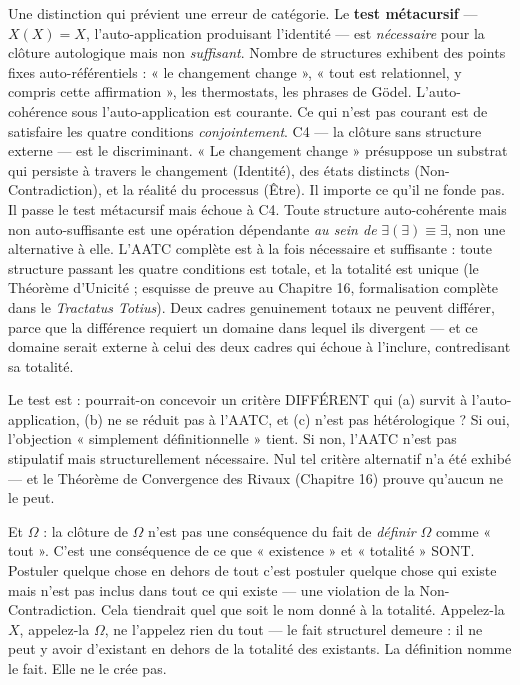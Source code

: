 \documentclass[10pt, openany, oneside]{book}
\begin{document}
Une distinction qui prévient une erreur de catégorie. Le \textbf{test métacursif} --- $X(X) = X$, l'auto-application produisant l'identité --- est \textit{nécessaire} pour la clôture autologique mais non \textit{suffisant}. Nombre de structures exhibent des points fixes auto-référentiels : « le changement change », « tout est relationnel, y compris cette affirmation », les thermostats, les phrases de Gödel. L'auto-cohérence sous l'auto-application est courante. Ce qui n'est pas courant est de satisfaire les quatre conditions \textit{conjointement}. C4 --- la clôture sans structure externe --- est le discriminant. « Le changement change » présuppose un substrat qui persiste à travers le changement (Identité), des états distincts (Non-Contradiction), et la réalité du processus (Être). Il importe ce qu'il ne fonde pas. Il passe le test métacursif mais échoue à C4. Toute structure auto-cohérente mais non auto-suffisante est une opération dépendante \textit{au sein de} $\exists(\exists) \equiv \exists$, non une alternative à elle. L'AATC complète est à la fois nécessaire et suffisante : toute structure passant les quatre conditions est totale, et la totalité est unique (le Théorème d'Unicité ; esquisse de preuve au Chapitre 16, formalisation complète dans le \textit{Tractatus Totius}). Deux cadres genuinement totaux ne peuvent différer, parce que la différence requiert un domaine dans lequel ils divergent --- et ce domaine serait externe à celui des deux cadres qui échoue à l'inclure, contredisant sa totalité.

Le test est : pourrait-on concevoir un critère DIFFÉRENT qui (a) survit à l'auto-application, (b) ne se réduit pas à l'AATC, et (c) n'est pas hétérologique ? Si oui, l'objection « simplement définitionnelle » tient. Si non, l'AATC n'est pas stipulatif mais structurellement nécessaire. Nul tel critère alternatif n'a été exhibé --- et le Théorème de Convergence des Rivaux (Chapitre 16) prouve qu'aucun ne le peut.

Et $\Omega$ : la clôture de $\Omega$ n'est pas une conséquence du fait de \textit{définir} $\Omega$ comme « tout ». C'est une conséquence de ce que « existence » et « totalité » SONT. Postuler quelque chose en dehors de tout c'est postuler quelque chose qui existe mais n'est pas inclus dans tout ce qui existe --- une violation de la Non-Contradiction. Cela tiendrait quel que soit le nom donné à la totalité. Appelez-la $X$, appelez-la $\Omega$, ne l'appelez rien du tout --- le fait structurel demeure : il ne peut y avoir d'existant en dehors de la totalité des existants. La définition nomme le fait. Elle ne le crée pas.
\end{document}

